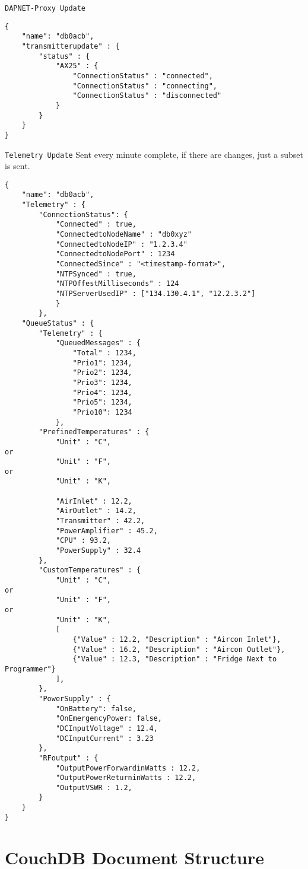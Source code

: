 \documentclass[a4paper]{article}
\begin{document}
\texttt{DAPNET-Proxy Update}
\begin{lstlisting}
{
    "name": "db0acb",
    "transmitterupdate" : {
        "status" : {
            "AX25" : {
                "ConnectionStatus" : "connected",
                "ConnectionStatus" : "connecting",
                "ConnectionStatus" : "disconnected"
            }
        }
    }
}
\end{lstlisting}

\texttt{Telemetry Update}
Sent every minute complete, if there are changes, just a subset is sent.
\begin{lstlisting}
{
    "name": "db0acb",
    "Telemetry" : {
        "ConnectionStatus": {
            "Connected" : true,
            "ConnectedtoNodeName" : "db0xyz"
            "ConnectedtoNodeIP" : "1.2.3.4"
            "ConnectedtoNodePort" : 1234
            "ConnectedSince" : "<timestamp-format>",
	    	"NTPSynced" : true,
            "NTPOffestMilliseconds" : 124
            "NTPServerUsedIP" : ["134.130.4.1", "12.2.3.2"]
            }
        },
    "QueueStatus" : {
        "Telemetry" : {
            "QueuedMessages" : {
                "Total" : 1234,
                "Prio1": 1234,
                "Prio2": 1234,
                "Prio3": 1234,
                "Prio4": 1234,
                "Prio5": 1234,
                "Prio10": 1234
            },
        "PrefinedTemperatures" : {
            "Unit" : "C",
or
            "Unit" : "F",
or
            "Unit" : "K",
         
            "AirInlet" : 12.2,
            "AirOutlet" : 14.2,
            "Transmitter" : 42.2,
            "PowerAmplifier" : 45.2,
            "CPU" : 93.2,
            "PowerSupply" : 32.4
        },
        "CustomTemperatures" : {
            "Unit" : "C",
or
            "Unit" : "F",
or
            "Unit" : "K",
            [
                {"Value" : 12.2, "Description" : "Aircon Inlet"},
                {"Value" : 16.2, "Description" : "Aircon Outlet"},
                {"Value" : 12.3, "Description" : "Fridge Next to Programmer"}
            ],
        },
        "PowerSupply" : {
            "OnBattery": false,
            "OnEmergencyPower: false,
            "DCInputVoltage" : 12.4,
            "DCInputCurrent" : 3.23
        },
        "RFoutput" : {
            "OutputPowerForwardinWatts : 12.2,
            "OutputPowerReturninWatts : 12.2,
            "OutputVSWR : 1.2,
        }
    }
}
\end{lstlisting}
\section{CouchDB Document Structure}
\end{document}
